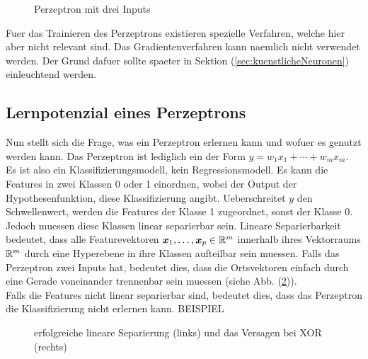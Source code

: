 \para{}
\begin{figure}[h!]
  \centering
  \caption{Perzeptron mit drei Inputs}
  \label{fi:perzeptron}
\end{figure}
\para{}
Fuer das Trainieren des Perzeptrons existieren spezielle Verfahren, welche hier
aber nicht relevant sind. Das Gradientenverfahren kann naemlich nicht verwendet
werden. Der Grund dafuer sollte spaeter in Sektion (\ref{sec:kuenstlicheNeuronen}) einleuchtend werden.

\para{}
\cite{wiki:perzeptron}
\cite{Nielsen}

\subsection{Lernpotenzial eines Perzeptrons}
Nun stellt sich die Frage, was ein Perzeptron erlernen kann und wofuer es genutzt werden kann.
Das Perzeptron ist lediglich ein  der Form
$y = w_1x_1 + \cdots + w_m x_m$. Es ist also ein Klassifizierungsmodell, kein Regressionsmodell.
Es kann die Features in zwei Klassen 0 oder 1 einordnen, wobei der Output der
Hypothesenfunktion, diese Klassifizierung angibt.
Ueberschreitet $y$ den Schwellenwert, werden die Features der Klasse 1 zugeordnet, sonst
der Klasse 0.
Jedoch muessen diese Klassen linear separierbar sein.
\para{}
Lineare Separierbarkeit bedeutet, dass alle Featurevektoren $\bm{x}_1,\ldots,\bm{x}_p \in \mathbb{R}^m$
innerhalb ihres Vektorraums $\mathbb{R}^m$ durch eine Hyperebene in ihre Klassen aufteilbar sein muessen.
Falls das Perzeptron zwei Inputs hat, bedeutet dies, dass die Ortsvektoren
einfach durch eine Gerade voneinander trennenbar sein muessen (siehe Abb.
(\ref{fig:linearer_Klassifikator})). \\
Falls die Features nicht linear separierbar sind, bedeutet dies, dass das
Perzeptron die Klassifizierung nicht erlernen kann.
BEISPIEL
\\
\begin{figure}[h!]
  \caption{erfolgreiche lineare Separierung (links) und das Versagen bei XOR (rechts)}
  \label{fig:linearer_Klassifikator}
\end{figure}
\para{}
\cite{wiki:perzeptron}
\cite{wiki:linear_separability}

